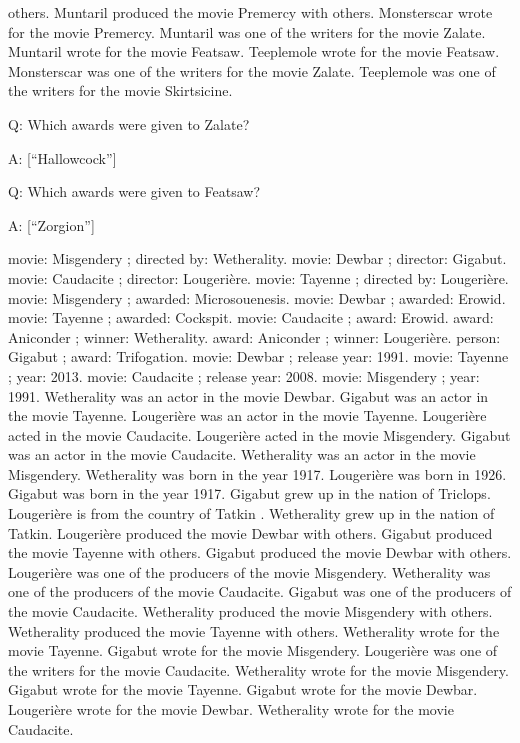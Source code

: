 \documentclass[
]{article}
\begin{document}
others. Muntaril produced the movie Premercy with others. Monsterscar
wrote for the movie Premercy. Muntaril was one of the writers for the
movie Zalate. Muntaril wrote for the movie Featsaw. Teeplemole wrote for
the movie Featsaw. Monsterscar was one of the writers for the movie
Zalate. Teeplemole was one of the writers for the movie Skirtsicine.

Q: Which awards were given to Zalate?

A: {[}``Hallowcock''{]}

Q: Which awards were given to Featsaw?

A: {[}``Zorgion''{]}

movie: Misgendery ; directed by: Wetherality. movie: Dewbar ; director:
Gigabut. movie: Caudacite ; director: Lougerière. movie: Tayenne ;
directed by: Lougerière. movie: Misgendery ; awarded: Microsouenesis.
movie: Dewbar ; awarded: Erowid. movie: Tayenne ; awarded: Cockspit.
movie: Caudacite ; award: Erowid. award: Aniconder ; winner:
Wetherality. award: Aniconder ; winner: Lougerière. person: Gigabut ;
award: Trifogation. movie: Dewbar ; release year: 1991. movie: Tayenne ;
year: 2013. movie: Caudacite ; release year: 2008. movie: Misgendery ;
year: 1991. Wetherality was an actor in the movie Dewbar. Gigabut was an
actor in the movie Tayenne. Lougerière was an actor in the movie
Tayenne. Lougerière acted in the movie Caudacite. Lougerière acted in
the movie Misgendery. Gigabut was an actor in the movie Caudacite.
Wetherality was an actor in the movie Misgendery. Wetherality was born
in the year 1917. Lougerière was born in 1926. Gigabut was born in the
year 1917. Gigabut grew up in the nation of Triclops. Lougerière is from
the country of Tatkin . Wetherality grew up in the nation of Tatkin.
Lougerière produced the movie Dewbar with others. Gigabut produced the
movie Tayenne with others. Gigabut produced the movie Dewbar with
others. Lougerière was one of the producers of the movie Misgendery.
Wetherality was one of the producers of the movie Caudacite. Gigabut was
one of the producers of the movie Caudacite. Wetherality produced the
movie Misgendery with others. Wetherality produced the movie Tayenne
with others. Wetherality wrote for the movie Tayenne. Gigabut wrote for
the movie Misgendery. Lougerière was one of the writers for the movie
Caudacite. Wetherality wrote for the movie Misgendery. Gigabut wrote for
the movie Tayenne. Gigabut wrote for the movie Dewbar. Lougerière wrote
for the movie Dewbar. Wetherality wrote for the movie Caudacite.
\end{document}

